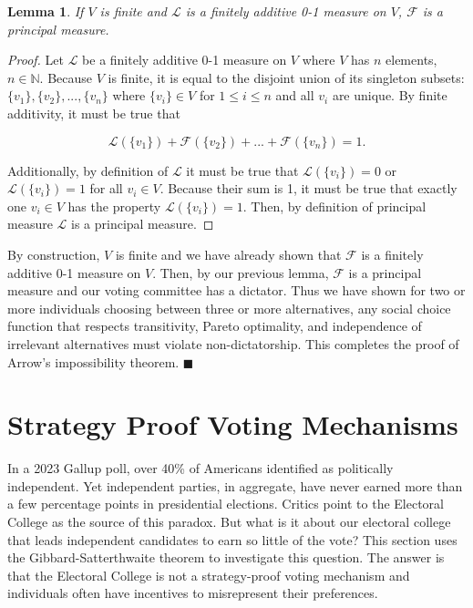 \documentclass{amsart}
\newtheorem{lemma}{Lemma}
\theoremstyle{plain}
\begin{document}
\begin{lemma}
    If $V$ is finite and $\mathcal{L}$ is a finitely additive 0-1 measure on $V$, $\mathcal{F}$ is a principal measure.
\end{lemma}

\begin{proof}
    Let $\mathcal{L}$ be a finitely additive 0-1 measure on $V$ where $V$ has $n$ elements, $n \in \mathbb{N}$. Because $V$ is finite, it is equal to the disjoint union of its singleton subsets: $\{v_1\}, \{v_2\}, ... , \{v_n\}$ where $\{v_i\} \in V$ for $1 \le i \le n$ and all $v_i$ are unique. By finite additivity, it must be true that 

    \begin{equation*}
        \mathcal{L}(\{v_1\}) + \mathcal{F}(\{v_2\}) + ... + \mathcal{F}(\{v_n\}) = 1.
    \end{equation*}

    \vskip 0.25cm

    Additionally, by definition of $\mathcal{L}$ it must be true that $\mathcal{L}(\{v_i\}) = 0$ or $\mathcal{L}(\{v_i\}) = 1$ for all $v_i \in V$. Because their sum is 1, it must be true that exactly one $v_i \in V$ has the property $\mathcal{L}(\{v_i\}) = 1$. Then, by definition of principal measure $\mathcal{L}$ is a principal measure.
\end{proof}

By construction, $V$ is finite and we have already shown that $\mathcal{F}$ is a finitely additive 0-1 measure on $V$. Then, by our previous lemma, $\mathcal{F}$ is a principal measure and our voting committee has a dictator. Thus we have shown for two or more individuals choosing between three or more alternatives, any social choice function that respects transitivity, Pareto optimality, and independence of irrelevant alternatives must violate non-dictatorship. This completes the proof of Arrow's impossibility theorem. $\blacksquare$

\section{Strategy Proof Voting Mechanisms}

In a 2023 Gallup poll, over 40\% of Americans identified as politically independent. \cite{Gallup}  Yet independent parties, in aggregate, have never earned more than a few percentage points in presidential elections. \cite{ElectoralCollege} Critics point to the Electoral College as the source of this paradox. But what is it about our electoral college that leads independent candidates to earn so little of the vote? This section uses the Gibbard-Satterthwaite theorem to investigate this question. The answer is that the Electoral College is not a strategy-proof voting mechanism and individuals often have incentives to misrepresent their preferences.
\end{document}
